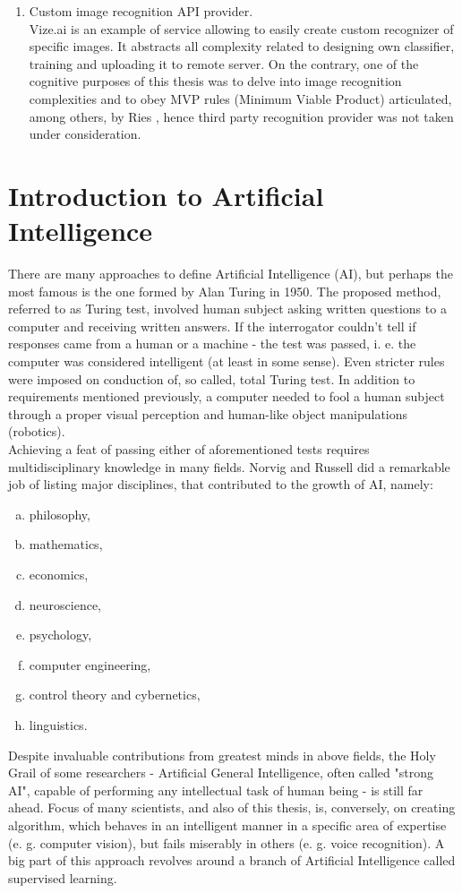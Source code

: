 \documentclass[11pt]{article}
\begin{document}
\begin{enumerate}[1)]
\item Custom image recognition API provider.\\
Vize.ai is an example of service allowing to easily create custom recognizer of specific images. It abstracts all complexity related to designing own classifier, training and uploading it to remote server. On the contrary, one of the cognitive purposes of this thesis was to delve into image recognition complexities and to obey MVP rules (Minimum Viable Product) articulated, among others, by Ries \cite{lean_startup}, hence third party recognition provider was not taken under consideration.
\end{enumerate} 
\clearpage

\section{Introduction to Artificial Intelligence} \label{introduction_to_ai}
There are many approaches to define Artificial Intelligence (AI), but perhaps the most famous is the one formed by Alan Turing in 1950. The proposed method, referred to as Turing test, involved human subject asking written questions to a computer and receiving written answers. If the interrogator couldn't tell if responses came from a human or a machine - the test was passed, i. e. the computer was considered intelligent (at least in some sense). Even stricter rules were imposed on conduction of, so called, total Turing test. In addition to requirements mentioned previously, a computer needed to fool a human subject through a proper visual perception and human-like object manipulations (robotics).\\

Achieving a feat of passing either of aforementioned tests requires multidisciplinary knowledge in many fields. Norvig and Russell \cite{ai_modern_approach} did a remarkable job of listing major disciplines, that contributed to the growth of AI, namely:
\begin{enumerate}[a)]
\item philosophy,
\item mathematics,
\item economics,
\item neuroscience,
\item psychology,
\item computer engineering,
\item control theory and cybernetics,
\item linguistics.
\end{enumerate}
Despite invaluable contributions from greatest minds in above fields, the Holy Grail of some researchers - Artificial General Intelligence, often called "strong AI", capable of performing any intellectual task of human being - is still far ahead. Focus of many scientists, and also of this thesis, is, conversely, on creating algorithm, which behaves in an intelligent manner in a specific area of expertise (e. g. computer vision), but fails miserably in others (e. g. voice recognition). A big part of this approach revolves around a branch of Artificial Intelligence called supervised learning. \\
\end{document}
